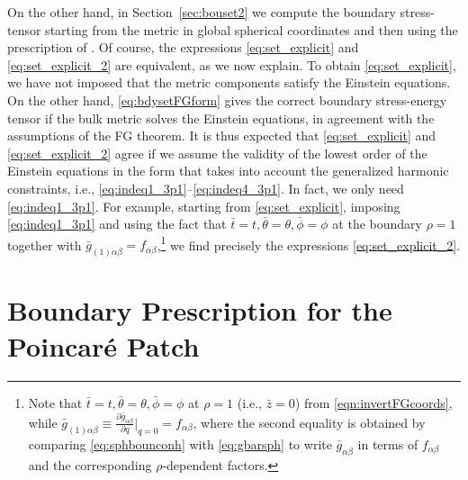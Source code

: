 \documentclass[a4paper,11pt]{article}
\numberwithin{equation}{section}
\begin{document}
On the other hand, in Section~\ref{sec:bouset2} we compute the boundary stress-tensor starting from the metric in global spherical coordinates and then using the prescription of \cite{Balasubramanian:1999re}. Of course, the expressions \eqref{eq:set_explicit} and \eqref{eq:set_explicit_2} are equivalent, as we now explain. To obtain \eqref{eq:set_explicit}, we have not imposed that the metric components satisfy the Einstein equations. On the other hand, \eqref{eq:bdysetFGform} gives the correct boundary stress-energy tensor if the bulk metric solves the Einstein equations, in agreement with the assumptions of the FG theorem. It is thus expected that \eqref{eq:set_explicit} and \eqref{eq:set_explicit_2} agree if we assume the validity of the lowest order of the Einstein equations in the form that takes into account the generalized harmonic constraints, i.e., \eqref{eq:indeq1_3p1}--\eqref{eq:indeq4_3p1}.
In fact, we only need \eqref{eq:indeq1_3p1}. For example, starting from \eqref{eq:set_explicit}, imposing \eqref{eq:indeq1_3p1} and using the fact that $\bar{t}=t,\bar{\theta}=\theta,\bar{\phi}=\phi$ at the boundary $\rho=1$ together with $\bar{g}_{(1)\alpha\beta}=f_{\alpha\beta}$,\footnote{Note that $\bar{t}=t,\bar{\theta}=\theta,\bar{\phi}=\phi$ at $\rho=1$ (i.e., $\bar{z}=0$) from \eqref{eqn:invertFGcoords}, while $\bar{g}_{(1)\alpha\beta}\equiv\frac{\partial \bar{g}_{\alpha\beta}}{\partial q}\bigr|_{q=0}=f_{\alpha\beta}$, where the second equality is obtained by comparing \eqref{eq:sphbounconh} with \eqref{eq:gbarsph} to write $\bar{g}_{\alpha\beta}$ in terms of $f_{\alpha\beta}$ and the corresponding $\rho$-dependent factors.} we find precisely the expressions \eqref{eq:set_explicit_2}.


\section{Boundary Prescription for the Poincar\'e Patch}\label{sec:poincare}
\end{document}
